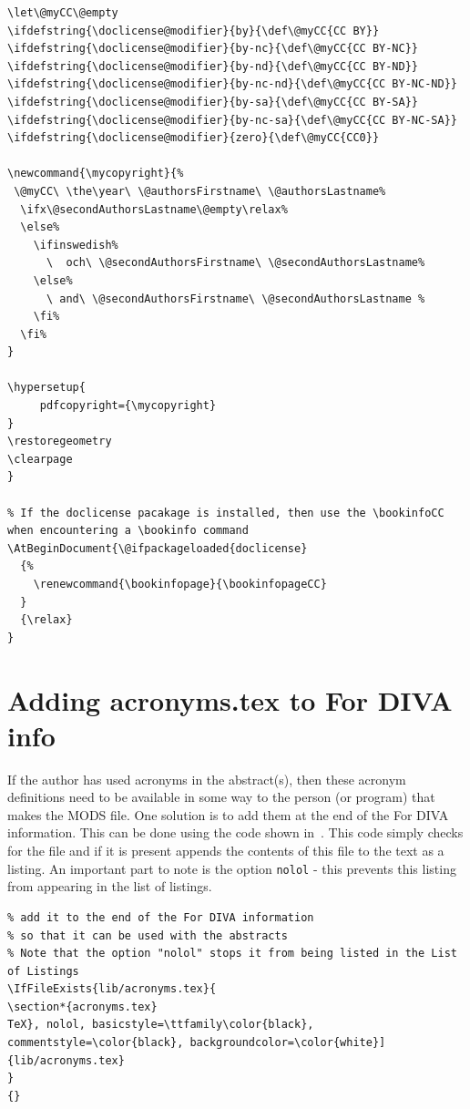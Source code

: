 \begin{lstlisting}[language={[LaTeX]TeX}, caption={Processing copyright PDF metadata information in \textbackslash bookinfopageCC}, label=lst:bookinfopageCopyrightPDFmetadata]
\let\@myCC\@empty
\ifdefstring{\doclicense@modifier}{by}{\def\@myCC{CC BY}}
\ifdefstring{\doclicense@modifier}{by-nc}{\def\@myCC{CC BY-NC}}
\ifdefstring{\doclicense@modifier}{by-nd}{\def\@myCC{CC BY-ND}}
\ifdefstring{\doclicense@modifier}{by-nc-nd}{\def\@myCC{CC BY-NC-ND}}
\ifdefstring{\doclicense@modifier}{by-sa}{\def\@myCC{CC BY-SA}}
\ifdefstring{\doclicense@modifier}{by-nc-sa}{\def\@myCC{CC BY-NC-SA}}
\ifdefstring{\doclicense@modifier}{zero}{\def\@myCC{CC0}}

\newcommand{\mycopyright}{%
 \@myCC\ \the\year\ \@authorsFirstname\ \@authorsLastname%
  \ifx\@secondAuthorsLastname\@empty\relax%
  \else%
    \ifinswedish%
      \  och\ \@secondAuthorsFirstname\ \@secondAuthorsLastname%
    \else%
      \ and\ \@secondAuthorsFirstname\ \@secondAuthorsLastname %
    \fi%
  \fi%
}

\hypersetup{
     pdfcopyright={\mycopyright} 
}
\restoregeometry
\clearpage
}

% If the doclicense pacakage is installed, then use the \bookinfoCC when encountering a \bookinfo command
\AtBeginDocument{\@ifpackageloaded{doclicense}
  {%
    \renewcommand{\bookinfopage}{\bookinfopageCC}
  }
  {\relax}
}
\end{lstlisting}

\section[Adding acronyms.tex to For DIVA info]{Adding acronyms.tex to For DIVA info}
\label{sec:acronymsInForDIVAdata}
If the author has used acronyms in the abstract(s), then these acronym definitions need to be available in some way to the person (or program) that makes the MODS file. One solution is to add them at the end of the For DIVA information. This can be done using the code shown in~. This code simply checks for the file and if it is present appends the contents of this file to the text as a listing. An important part to note is the option \texttt{nolol} - this prevents this listing from appearing in the list of listings.

\begin{lstlisting}[language={[LaTeX]TeX}, caption={Code for adding acronyms.tex at the end of the For DIVA data}, label=lst:includeAcronymsFile]
% If there is an acronyms.tex file,
% add it to the end of the For DIVA information
% so that it can be used with the abstracts
% Note that the option "nolol" stops it from being listed in the List of Listings
\IfFileExists{lib/acronyms.tex}{
\section*{acronyms.tex}
TeX}, nolol, basicstyle=\ttfamily\color{black},
commentstyle=\color{black}, backgroundcolor=\color{white}]{lib/acronyms.tex}
}
{}
\end{lstlisting}


